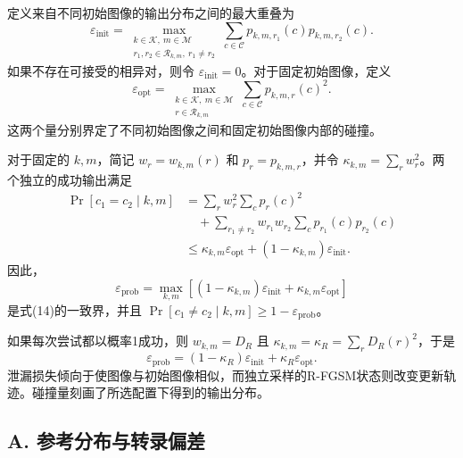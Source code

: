 定义来自不同初始图像的输出分布之间的最大重叠为
\begin{equation}
\varepsilon_{\mathrm{init}} = \max_{\substack{k \in \mathcal{K}, \ m \in \mathcal{M} \\ r_1, r_2 \in \mathcal{R}_{k,m}, \ r_1 \neq r_2}} \sum_{c \in \mathcal{C}} p_{k,m,r_1}(c) p_{k,m,r_2}(c). \tag{31}
\end{equation}
如果不存在可接受的相异对，则令 \(\varepsilon_{\mathrm{init}} = 0\)。对于固定初始图像，定义
\begin{equation}
\varepsilon_{\mathrm{opt}} = \max_{\substack{k \in \mathcal{K}, \ m \in \mathcal{M} \\ r \in \mathcal{R}_{k,m}}} \sum_{c \in \mathcal{C}} p_{k,m,r}(c)^2. \tag{32}
\end{equation}
这两个量分别界定了不同初始图像之间和固定初始图像内部的碰撞。

对于固定的 \(k, m\)，简记 \(w_r = w_{k,m}(r)\) 和 \(p_r = p_{k,m,r}\)，并令 \(\kappa_{k,m} = \sum_r w_r^2\)。两个独立的成功输出满足
\begin{equation}
\begin{aligned}
\Pr[c_1 = c_2 \mid k, m] &= \sum_r w_r^2 \sum_c p_r(c)^2 \\
&\quad + \sum_{r_1 \neq r_2} w_{r_1} w_{r_2} \sum_c p_{r_1}(c) p_{r_2}(c) \\
&\le \kappa_{k,m} \varepsilon_{\mathrm{opt}} + (1 - \kappa_{k,m}) \varepsilon_{\mathrm{init}}.
\end{aligned} \tag{33}
\end{equation}
因此，
\begin{equation}
\varepsilon_{\mathrm{prob}} = \max_{k,m} \left[ (1 - \kappa_{k,m}) \varepsilon_{\mathrm{init}} + \kappa_{k,m} \varepsilon_{\mathrm{opt}} \right] \tag{34}
\end{equation}
是式(14)的一致界，并且 \(\Pr[c_1 \neq c_2 \mid k, m] \ge 1 - \varepsilon_{\mathrm{prob}}\)。

如果每次尝试都以概率1成功，则 \(w_{k,m} = D_R\) 且 \(\kappa_{k,m} = \kappa_R = \sum_r D_R(r)^2\)，于是
\begin{equation}
\varepsilon_{\mathrm{prob}} = (1 - \kappa_R) \varepsilon_{\mathrm{init}} + \kappa_R \varepsilon_{\mathrm{opt}}. \tag{35}
\end{equation}
泄漏损失倾向于使图像与初始图像相似，而独立采样的R-FGSM状态则改变更新轨迹。碰撞量刻画了所选配置下得到的输出分布。

\subsection*{A. 参考分布与转录偏差}

